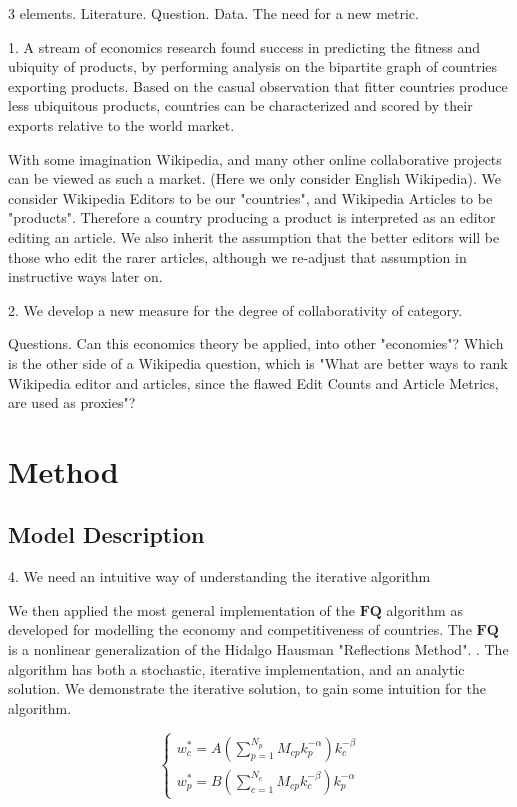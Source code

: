 \documentclass{acm_proc_article-sp}
\begin{document}
3 elements. Literature. Question. Data. The need for a new metric.

1. A stream of economics research found success in predicting the fitness and ubiquity of products, by performing analysis on the bipartite graph of countries exporting products. Based on the casual observation that fitter countries produce less ubiquitous products, countries can be characterized and scored by their exports relative to the world market.

With some imagination Wikipedia, and many other online collaborative projects can be viewed as such a market. (Here we only consider English Wikipedia). We consider Wikipedia Editors to be our "countries", and Wikipedia Articles to be "products". Therefore a country producing a product is interpreted as an editor editing an article. We also inherit the assumption that the better editors will be those who edit the rarer articles, although we re-adjust that assumption in instructive ways later on. 


2. We develop a new measure for the degree of collaborativity of category.

Questions. Can this economics theory be applied, into other "economies"? Which is the other side of a Wikipedia question, which is "What are better ways to rank Wikipedia editor and articles, since the flawed Edit Counts and Article Metrics, are used as proxies"?



 

\section{Method}

\subsection{Model Description}
4. We need an intuitive way of understanding the iterative algorithm

We then applied the most general implementation of the $\mathbf{FQ}$ algorithm as developed for modelling the economy and competitiveness of countries. The $\mathbf{FQ}$ is a nonlinear generalization of the Hidalgo Hausman "Reflections Method". \cite{Caldarelli}. The algorithm has both a stochastic, iterative implementation, and an analytic solution. We demonstrate the iterative solution, to gain some intuition for the algorithm.

\begin{equation}
\begin{cases}
 w^*_c = A(\sum^{N_p}_{p=1} M_{cp}k_p^{-\alpha})k_c^{-\beta} \\
w^*_p = B(\sum^{N_c}_{c=1} M_{cp}k_c^{-\beta})k_p^{-\alpha}
\end{cases}
\end{equation}
\end{document}
